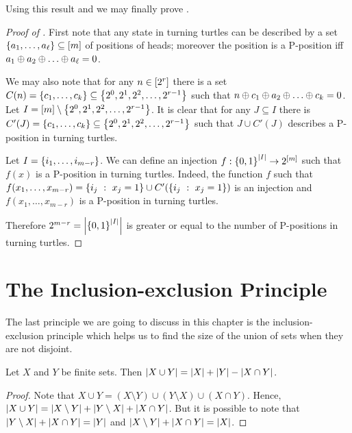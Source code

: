 Using this result and  we may
finally prove .
\begin{proof}[Proof of ]
  First note that any state in turning turtles can be described by a set 
  $\set{a_1, \dots, a_\ell} \subseteq \range{m}$ of positions of heads; moreover
  the position is a P-position iff 
  $a_1 \bitwisexor a_2 \bitwisexor \dots \bitwisexor a_\ell = 0$.

  We may also note that for any $n \in  {[{2^r}]}$ there is a set $C(n) =
  \set{c_1, \dots, c_k} \subseteq \set{2^0, 2^1, 2^2, \dots, 2^{r - 1}}$ such
  that 
  $n \bitwisexor c_1 \bitwisexor a_2 \bitwisexor \dots \bitwisexor c_k = 0$.
  Let $I = \range{m} \setminus \set{2^0, 2^1, 2^2, \dots, 2^{r - 1}}$.
  It is clear that for any $J \subseteq I$ there is 
  $C'(J) = \set{c_1, \dots, c_k} \subseteq 
    \set{2^0, 2^1, 2^2, \dots, 2^{r - 1}}$ such that $J \cup C'(J)$ describes a
  P-position in turning turtles.

  Let $I = \set{i_1, \dots, i_{m - r}}$. We can define an injection 
  $f : \set{0, 1}^{\cardinality{I}} \to 2^{\range{m}}$ such that $f(x)$ is a 
  P-position in turning turtles. Indeed, the function $f$ such that
  $f(x_1, \dots, x_{m - r}) = \set[x_j = 1]{i_j} \cup C'(\set[x_j = 1]{i_j})$
  is an injection and $f(x_1, \dots, x_{m - r})$ is a P-position in turning
  turtles.

  Therefore $2^{m - r} = \cardinality{\set{0, 1}^{\cardinality{I}}}$ is greater
  or equal to the number of P-positions in turning turtles.
\end{proof}

\section{The Inclusion-exclusion Principle}

The last principle we are going to discuss in this chapter is the
inclusion-exclusion principle which helps us to find the size of the union
of sets when they are not disjoint.
\begin{theorem}
\label{theorem:inclusion-exclusion-principle}
  Let $X$ and $Y$ be finite sets. Then $\left|{X \cup Y}\right| = \left|{X}\right|
  + \left|{Y}\right| - \left|{X \cap Y}\right|$.
\end{theorem}
\begin{proof}
  Note that $X \cup Y = (X \setminus Y) \cup (Y \setminus X) \cup (X \cap Y)$.
  Hence, $\left|{X \cup Y}\right| = \left|{X \setminus Y}\right| + 
  \left|{Y \setminus X}\right| + \left|{X \cap Y}\right|$. But it
  is possible to note that $\left|{Y \setminus X}\right| + \left|{X \cap Y}\right|
  = \left|{Y}\right|$ and $\left|{X \setminus Y}\right| + \left|{X \cap Y}\right| =
  \left|{X}\right|$.
\end{proof}

